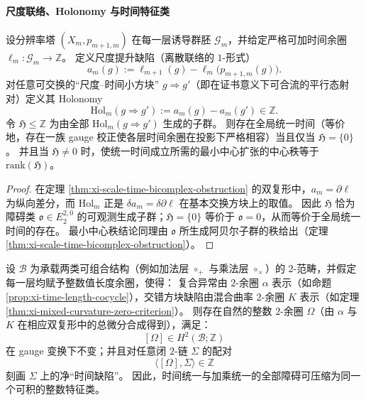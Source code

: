 \paragraph{尺度联络、Holonomy 与时间特征类}

\begin{theorem}\label{thm:xi-scale-time-connection-holonomy-criterion}
设分辨率塔 \((X_m,p_{m+1,m})\) 在每一层诱导群胚 \(\mathcal G_m\)，并给定严格可加时间余圈 \(\ell_m:\mathcal G_m\to\mathbb Z\)。
定义尺度提升缺陷（离散联络的 \(1\)-形式）
\[
a_m(g):=\ell_{m+1}(g)-\ell_m\!\bigl(p_{m+1,m}(g)\bigr).
\]
对任意可交换的“尺度--时间小方块” \(g\Rightarrow g'\)（即在证书意义下可合流的平行态射对）定义其 Holonomy
\[
\mathrm{Hol}_m(g\Rightarrow g'):=a_m(g)-a_m(g')\in\mathbb Z.
\]
令 \(\mathfrak H\le \mathbb Z\) 为由全部 \(\mathrm{Hol}_m(g\Rightarrow g')\) 生成的子群。
则存在全局统一时间（等价地，存在一族 gauge 校正使各层时间余圈在投影下严格相容）当且仅当 \(\mathfrak H=\{0\}\)。
并且当 \(\mathfrak H\neq 0\) 时，使统一时间成立所需的最小中心扩张的中心秩等于 \(\mathrm{rank}(\mathfrak H)\)。
\end{theorem}

\begin{proof}
在定理 \ref{thm:xi-scale-time-bicomplex-obstruction} 的双复形中，\(a_m=\partial\ell\) 为纵向差分，而 \(\mathrm{Hol}_m\) 正是 \(\delta a_m=\delta\partial\ell\) 在基本交换方块上的取值。
因此 \(\mathfrak H\) 恰为障碍类 \(\mathfrak o\in E_2^{2,0}\) 的可观测生成子群；\(\mathfrak H=\{0\}\) 等价于 \(\mathfrak o=0\)，从而等价于全局统一时间的存在。
最小中心秩结论同理由 \(\mathfrak o\) 所生成阿贝尔子群的秩给出（定理 \ref{thm:xi-scale-time-bicomplex-obstruction}）。
\end{proof}

\begin{theorem}\label{thm:xi-time-characteristic-class-integrality}
设 \(\mathcal B\) 为承载两类可组合结构（例如加法层 \(\circ_+\) 与乘法层 \(\circ_\times\)）的 \(2\)-范畴，并假定每一层均赋予整数值长度余圈，使得：
复合异常由 \(2\)-余圈 \(\alpha\) 表示（如命题 \ref{prop:xi-time-length-cocycle}），交错方块缺陷由混合曲率 \(2\)-余圈 \(K\) 表示（如定理 \ref{thm:xi-mixed-curvature-zero-criterion}）。
则存在自然的整数 \(2\)-余圈 \(\Omega\)（由 \(\alpha\) 与 \(K\) 在相应双复形中的总微分合成得到），满足：
\[
[\Omega]\in H^2(\mathcal B;\mathbb Z)
\]
在 gauge 变换下不变；并且对任意闭 \(2\)-链 \(\Sigma\) 的配对
\[
\langle[\Omega],\Sigma\rangle\in\mathbb Z
\]
刻画 \(\Sigma\) 上的净“时间缺陷”。
因此，时间统一与加乘统一的全部障碍可压缩为同一个可积的整数特征类。
\end{theorem}

